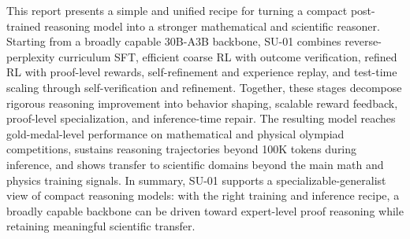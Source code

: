 \documentclass{llmxive}
\begin{document}
This report presents a simple and unified recipe for turning a compact
post-trained reasoning model into a stronger mathematical and scientific
reasoner. Starting from a broadly capable 30B-A3B backbone, SU-01 combines
reverse-perplexity curriculum SFT, efficient coarse RL with outcome verification,
refined RL with proof-level rewards, self-refinement and experience replay, and
test-time scaling through self-verification and refinement. Together, these
stages decompose rigorous reasoning improvement into behavior shaping, scalable
reward feedback, proof-level specialization, and inference-time repair. 
The resulting model reaches gold-medal-level performance on mathematical and
physical olympiad competitions, sustains reasoning trajectories beyond 100K
tokens during inference, and shows transfer to scientific domains beyond the
main math and physics training signals. 
In summary, SU-01 supports a specializable-generalist view of compact reasoning models: with the right training and inference recipe, a broadly capable backbone can be driven toward expert-level proof reasoning while retaining meaningful scientific transfer.
\end{document}

